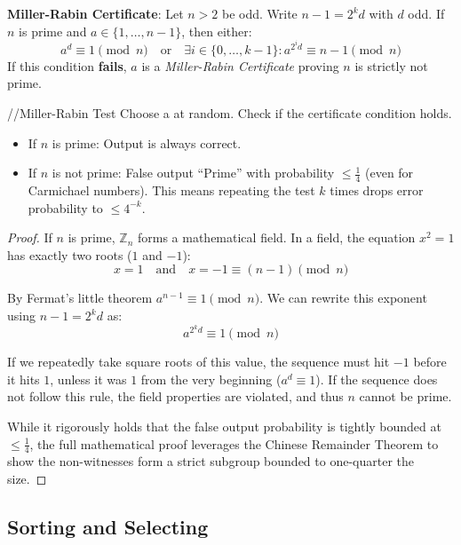 \begin{definition}
	\textbf{Miller-Rabin Certificate}: Let $n>2$ be odd. Write $n-1 = 2^k d$ with $d$ odd. If $n$ is prime and $a \in \{1, \dots, n-1\}$, then either:
	$$ a^d \equiv 1 \pmod n \quad \text{or} \quad \exists i \in \{0, \dots, k-1\}: a^{2^i d} \equiv n-1 \pmod n $$
	If this condition \textbf{fails}, $a$ is a \textit{Miller-Rabin Certificate} proving $n$ is strictly not prime.
\end{definition}

\begin{algorithm}
	//Miller-Rabin Test
	Choose a at random.
	Check if the certificate condition holds.
\end{algorithm}

\begin{remark}
	\begin{itemize}
		\item If $n$ is prime: Output is always correct.
		\item If $n$ is not prime: False output ``Prime'' with probability $\leq \frac{1}{4}$ (even for Carmichael numbers). This means repeating the test $k$ times drops error probability to $\leq 4^{-k}$.
	\end{itemize}
\end{remark}

\begin{proof}
	If $n$ is prime, $\mathbb{Z}_n$ forms a mathematical field. In a field, the equation $x^2 = 1$ has exactly two roots ($1$ and $-1$):
	$$ x=1 \quad \text{and} \quad x=-1 \equiv (n-1) \pmod n $$

	By Fermat's little theorem $a^{n-1} \equiv 1 \pmod n$. We can rewrite this exponent using $n-1 = 2^k d$ as:
	$$ a^{2^k d} \equiv 1 \pmod n $$

	If we repeatedly take square roots of this value, the sequence must hit $-1$ before it hits $1$, unless it was $1$ from the very beginning ($a^d \equiv 1$). If the sequence does not follow this rule, the field properties are violated, and thus $n$ cannot be prime.

	While it rigorously holds that the false output probability is tightly bounded at $\leq \frac{1}{4}$, the full mathematical proof leverages the Chinese Remainder Theorem to show the non-witnesses form a strict subgroup bounded to one-quarter the size.
\end{proof}

\subsection{Sorting and Selecting}

